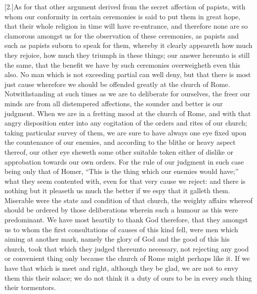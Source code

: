[2.]As for that other argument derived from the secret affection of papists, with whom our conformity in certain ceremonies is said to put them in great hope, that their whole religion in time will have re-entrance, and therefore none are so clamorous amongst us for the observation of these ceremonies, as papists and such as papists suborn to speak for them, whereby it clearly appeareth how much they rejoice, how much they triumph in these things; our answer hereunto is still the same, that the benefit we have by such ceremonies overweigheth even this also. No man which is not exceeding partial can well deny, but that there is most just cause wherefore we should be offended greatly at the church of Rome. Notwithstanding at such times as we are to deliberate for ourselves, the freer our minds are from all distempered affections, the sounder and better is our judgment. When we are in a fretting mood at the church of Rome, and with that angry disposition enter into any cogitation of the orders and rites of our church; taking particular survey of them, we are sure to have always one eye fixed upon the countenance of our enemies, and according to the blithe or heavy aspect thereof, our other eye sheweth some other suitable token either of dislike or approbation towards our own orders. For the rule of our judgment in such case being only that of Homer, “This is the thing which our enemies would have;” what they seem contented with, even for that very cause we reject: and there is nothing but it pleaseth us much the better if we espy that it galleth them. Miserable were the state and condition of that church, the  weighty affairs whereof should be ordered by those deliberations wherein such a humour as this were predominant. We have most heartily to thank God therefore, that they amongst us to whom the first consultations of causes of this kind fell, were men which aiming at another mark, namely the glory of God and the good of this his church, took that which they judged thereunto necessary, not rejecting any good or convenient thing only because the church of Rome might perhaps like it. If we have that which is meet and right, although they be glad, we are not to envy them this their solace; we do not think it a duty of ours to be in every such thing their tormentors.

